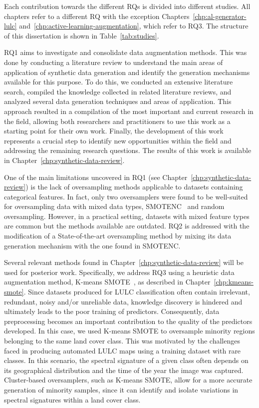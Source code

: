 Each contribution towards the different RQs is divided into different studies.
All chapters refer to a different RQ with the exception
Chapters~\ref{chp:al-generator-lulc}
and~\ref{chp:active-learning-augmentation}, which refer to RQ3. The structure
of this dissertation is shown in Table~\ref{tab:studies}.

RQ1 aims to investigate and consolidate data augmentation methods. This was
done by conducting a literature review to understand the main areas of
application of synthetic data generation and identify the generation
mechanisms available for this purpose. To do this, we conducted an extensive
literature search, compiled the knowledge collected in related literature
reviews, and analyzed several data generation techniques and areas of
application. This approach resulted in a compilation of the most important and
current research in the field, allowing both researchers and practitioners to
use this work as a starting point for their own work. Finally, the development
of this work represents a crucial step to identify new opportunities within
the field and addressing the remaining research questions. The results of this
work is available in Chapter~\ref{chp:synthetic-data-review}.

One of the main limitations uncovered in RQ1 (see
Chapter~\ref{chp:synthetic-data-review}) is the lack of oversampling
methods applicable to datasets containing categorical features. In fact, only
two oversamplers were found to be well-suited for oversampling data with mixed
data types, SMOTENC~\cite{Chawla2002} and random oversampling.  However, in a
practical setting, datasets with mixed feature types are common but the
methods available are outdated. RQ2 is addressed with the modification of a
State-of-the-art oversampling method by mixing its data generation mechanism
with the one found in SMOTENC\@.

Several relevant methods found in Chapter~\ref{chp:synthetic-data-review}
will be used for posterior work. Specifically, we address RQ3 using a
heuristic data augmentation method, K-means SMOTE~\cite{Douzas2018}, as
described in Chapter~\ref{chp:kmeans-smote}. Since datasets produced for LULC
classification often contain irrelevant, redundant, noisy and/or unreliable
data, knowledge discovery is hindered and ultimately leads to the poor
training of predictors. Consequently, data preprocessing becomes an important
contribution to the quality of the predictors developed. In this case, we used
K-means SMOTE to oversample minority regions belonging to the same land cover
class. This was motivated by the challenges faced in producing automated LULC
maps using a training dataset with rare classes. In this scenario, the
spectral signature of a given class often depends on its geographical
distribution and the time of the year the image was captured. Cluster-based
oversamplers, such as K-means SMOTE, allow for a more accurate generation of
minority samples, since it can identify and isolate variations in spectral
signatures within a land cover class.

